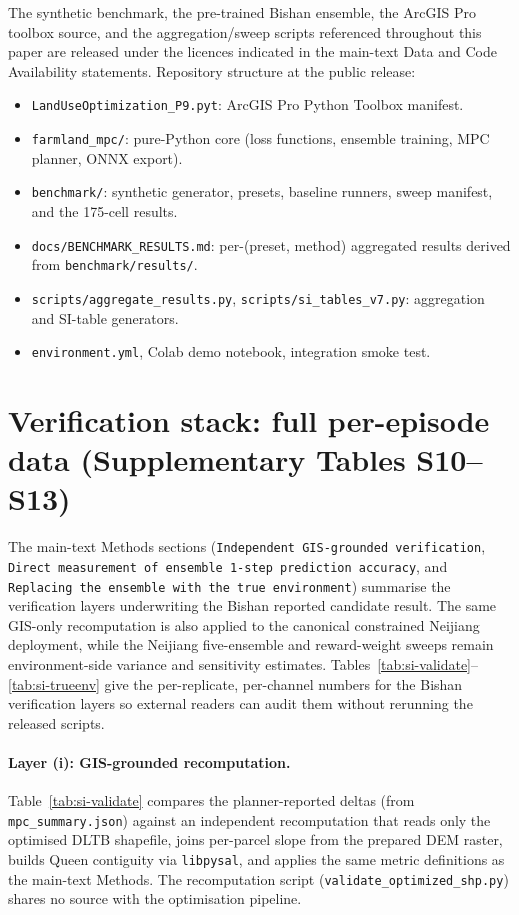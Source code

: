 \documentclass[11pt]{article}
\begin{document}
The synthetic benchmark, the pre-trained Bishan ensemble, the ArcGIS Pro toolbox source, and the aggregation/sweep scripts referenced throughout this paper are released under the licences indicated in the main-text Data and Code Availability statements. Repository structure at the public release:

\begin{itemize}
\item \texttt{LandUseOptimization\_P9.pyt}: ArcGIS Pro Python Toolbox manifest.
\item \texttt{farmland\_mpc/}: pure-Python core (loss functions, ensemble training, MPC planner, ONNX export).
\item \texttt{benchmark/}: synthetic generator, presets, baseline runners, sweep manifest, and the 175-cell results.
\item \texttt{docs/BENCHMARK\_RESULTS.md}: per-(preset, method) aggregated results derived from \texttt{benchmark/results/}.
\item \texttt{scripts/aggregate\_results.py}, \texttt{scripts/si\_tables\_v7.py}: aggregation and SI-table generators.
\item \texttt{environment.yml}, Colab demo notebook, integration smoke test.
\end{itemize}

\section{Verification stack: full per-episode data (Supplementary Tables S10--S13)}\label{si:s5-verification}

The main-text Methods sections (\texttt{Independent GIS-grounded verification}, \texttt{Direct measurement of ensemble 1-step prediction accuracy}, and \texttt{Replacing the ensemble with the true environment}) summarise the verification layers underwriting the Bishan reported candidate result. The same GIS-only recomputation is also applied to the canonical constrained Neijiang deployment, while the Neijiang five-ensemble and reward-weight sweeps remain environment-side variance and sensitivity estimates. Tables~\ref{tab:si-validate}--\ref{tab:si-trueenv} give the per-replicate, per-channel numbers for the Bishan verification layers so external readers can audit them without rerunning the released scripts.

\paragraph{Layer (i): GIS-grounded recomputation.} Table~\ref{tab:si-validate} compares the planner-reported deltas (from \texttt{mpc\_summary.json}) against an independent recomputation that reads only the optimised DLTB shapefile, joins per-parcel slope from the prepared DEM raster, builds Queen contiguity via \texttt{libpysal}, and applies the same metric definitions as the main-text Methods. The recomputation script (\texttt{validate\_optimized\_shp.py}) shares no source with the optimisation pipeline.
\end{document}
